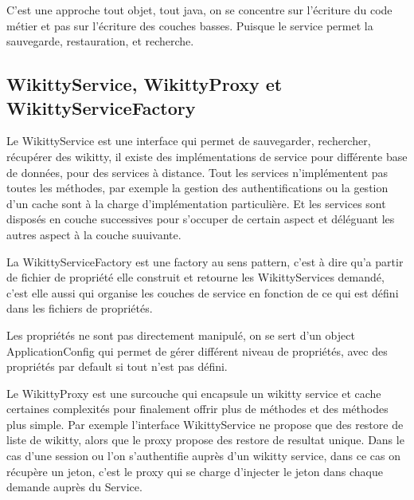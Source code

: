 C'est une approche tout objet, tout java, on se concentre sur l'écriture du code
métier et pas sur l'écriture des couches basses. Puisque le service permet la
sauvegarde, restauration, et recherche.

% 
% 


\subsection{WikittyService, WikittyProxy et WikittyServiceFactory}

Le WikittyService est une interface qui permet de sauvegarder, rechercher,
récupérer des wikitty, il existe des implémentations de service pour différente
base de données, pour des services à distance. Tout les services n'implémentent 
pas toutes les méthodes, par exemple la gestion des authentifications ou la 
gestion d'un cache sont à la charge d'implémentation particulière. Et les
services sont disposés en couche successives pour s'occuper de certain aspect
et déléguant les autres aspect à la couche suuivante.


La WikittyServiceFactory est une factory au sens pattern, c'est à dire qu'a 
partir de fichier de propriété elle construit et retourne les WikittyServices 
demandé, c'est elle aussi qui organise les couches de service en fonction de ce 
qui est défini dans les fichiers de propriétés.


Les propriétés ne sont pas directement manipulé, on se sert d'un object 
ApplicationConfig qui permet de gérer différent niveau de propriétés,
avec des propriétés par default si tout n'est pas défini.

Le WikittyProxy est une surcouche qui encapsule un wikitty service et cache 
certaines complexités pour finalement offrir plus de méthodes et des méthodes 
plus simple. Par exemple l'interface WikittyService ne propose que des 
restore de liste de wikitty, alors que le proxy propose des restore de resultat
unique. Dans le cas d'une session ou l'on s'authentifie auprès d'un wikitty 
service, dans ce cas on récupère un jeton, c'est le proxy qui se charge 
d'injecter le jeton dans chaque demande auprès du Service.


